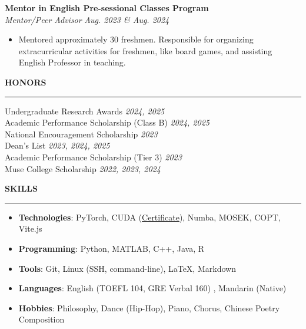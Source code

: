 \documentclass[10pt]{extarticle}
\newlength{\titlelength}
\newcommand{\customsection}[1]{
  \vspace{0.4em}%
  \settowidth{\titlelength}{\color{sectioncolor}\Large\bfseries\uppercase{#1}}
  {\color{sectioncolor}\Large\bfseries\uppercase{#1}} 
  {\color{sectioncolor}\rule[0.5ex]{\linewidth-\titlelength-0em}{0.5pt}}\par\vspace{0.2em}%
}
\begin{document}
\textbf{Mentor in English Pre-sessional Classes Program} \hfill {}\\
\textit{Mentor/Peer Advisor} \hfill \textit{Aug. 2023 \& Aug. 2024}
\begin{itemize}[leftmargin=1em, label=$\bullet$, nosep, topsep=0pt]
  \item Mentored approximately 30 freshmen. Responsible for organizing extracurricular activities for freshmen, like board games, and assisting English Professor in teaching.
\end{itemize}

\customsection{HONORS}
Undergraduate Research Awards \hfill \textit{2024, 2025}\\
Academic Performance Scholarship (Class B) \hfill \textit{2024, 2025}\\
National Encouragement Scholarship \hfill \textit{2023}\\
Dean's List \hfill \textit{2023, 2024, 2025}\\
Academic Performance Scholarship (Tier 3) \hfill \textit{2023}\\
Muse College Scholarship \hfill \textit{2022, 2023, 2024}

\customsection{Skills}
\begin{itemize}[leftmargin=1em, label=$\bullet$, nosep, topsep=0pt]
  \item \textbf{Technologies}: PyTorch, CUDA (\href{https://learn.nvidia.com/certificates?id=QmNw3vpFQqWRVcdDJY_PEw#}{Certificate}), Numba, MOSEK, COPT, Vite.js
  \item \textbf{Programming}: Python, MATLAB, C++, Java, R
  \item \textbf{Tools}: Git, Linux (SSH, command-line), \LaTeX{}, Markdown
  \item \textbf{Languages}: English (TOEFL 104, GRE Verbal 160) , Mandarin (Native)
  \item \textbf{Hobbies}: Philosophy, Dance (Hip-Hop), Piano, Chorus, Chinese Poetry Composition
\end{itemize}
\end{document}
